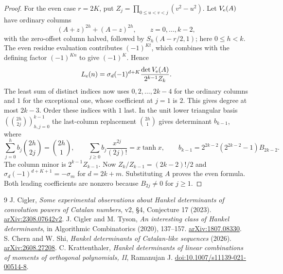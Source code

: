 \documentclass[11pt]{article}
\begin{document}
\begin{proof}
For the even case $r=2K$, put $Z_j=\prod_{0\le u<v<j}(v^2-u^2)$. Let $V_{\rm e}(A)$ have ordinary columns
\[
 (A+z)^{2h}+(A-z)^{2h},\qquad z=0,\ldots,k-2,
\]
with the zero-offset column halved, followed by $S_h(A-r/2,1)$; here $0\le h<k$. The even residue evaluation contributes $(-1)^{Kt}$, which combines with the defining factor $(-1)^{Kn}$ to give $(-1)^K$. Hence
\[
 L_{\rm e}(n)=\sigma_d(-1)^{d+K}
             \frac{\det V_{\rm e}(A)}{2^{k-1} Z_k}.
\]
The least sum of distinct indices now uses $0,2,\ldots,2k-4$ for the ordinary columns and $1$ for the exceptional one, whose coefficient at $j=1$ is $2$. This gives degree at most $2k-3$. Order these indices with $1$ last. In the unit lower triangular basis $(\binom{2h}{2j})_{h,j=0}^{k-1}$ the last-column replacement $\binom{2h}{1}$ gives determinant $b_{k-1}$, where
\[
 \sum_{j=0}^h b_j\binom{2h}{2j}=\binom{2h}{1},\qquad
 \sum_{j\ge0} b_j\frac{x^{2j}}{(2j)!}=x\tanh x,\qquad
 b_{k-1}=2^{2k-2}(2^{2k-2}-1)B_{2k-2}.
\]
The column minor is $2^{k-1}Z_{k-1}$. Now $Z_k/Z_{k-1}=(2k-2)!/2$ and $\sigma_d(-1)^{d+K+1}=-\sigma_m$ for $d=2k+m$. Substituting $A$ proves the even formula. Both leading coefficients are nonzero because $B_{2j}\ne0$ for $j\ge1$.
\end{proof}

\begin{thebibliography}{9}
 J. Cigler, \emph{Some experimental observations about Hankel determinants of convolution powers of Catalan numbers}, v2, \S4, Conjecture 17 (2023). \href{https://arxiv.org/abs/2308.07642v2}{arXiv:2308.07642v2}.
 J. Cigler and M. Tyson, \emph{An interesting class of Hankel determinants}, in Algorithmic Combinatorics (2020), 137--157. \href{https://arxiv.org/abs/1807.08330}{arXiv:1807.08330}.
 S. Chern and W. Shi, \emph{Hankel determinants of Catalan-like sequences} (2026). \href{https://arxiv.org/abs/2608.27208}{arXiv:2608.27208}.
 C. Krattenthaler, \emph{Hankel determinants of linear combinations of moments of orthogonal polynomials, II}, Ramanujan J. \href{https://doi.org/10.1007/s11139-021-00514-8}{doi:10.1007/s11139-021-00514-8}.
\end{thebibliography}
\end{document}
